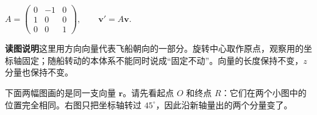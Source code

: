 \documentclass[a4paper,12pt,twoside,openany,fontset=none]{ctexbook}
\numberwithin{equation}{chapter}
\begin{document}
\begin{minipage}{\linewidth}
\par\vspace{5pt}
\noindent\begin{minipage}[c]{.36\linewidth}
\centering\linespread{1}\fontsize{10.5pt}{14pt}\selectfont
\(\displaystyle
 A=\begin{pmatrix}0&-1&0\\1&0&0\\0&0&1\end{pmatrix},\qquad
 \boldsymbol v'=A\boldsymbol v.
\)
\end{minipage}\hfill
\begin{minipage}[c]{.61\linewidth}
\linespread{1}\fontsize{10pt}{15pt}\selectfont\color{FourInk!85}
\textbf{读图说明}\quad 这里用方向向量代表飞船朝向的一部分。旋转中心取作原点，观察用的坐标轴固定；随船转动的本体系不能同时说成“固定不动”。向量的长度保持不变，$z$ 分量也保持不变。
\end{minipage}
\end{minipage}

\par\addvspace{12pt}
\par
\vspace{7pt}
下面两幅图画的是同一支向量 $\boldsymbol r$。请先看起点 $O$ 和终点 $R$：它们在两个小图中的位置完全相同。右图只把坐标轴转过 $45^\circ$，因此沿新轴量出的两个分量变了。
\end{document}
